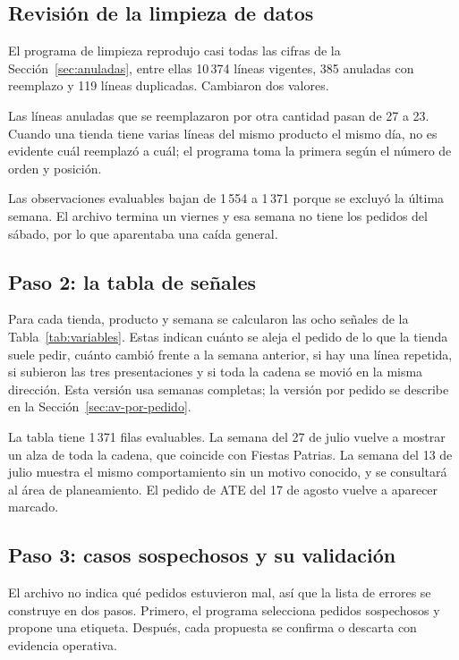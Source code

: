 \subsection{Revisión de la limpieza de datos}
\label{sec:av-limpieza}

El programa de limpieza reprodujo casi todas las cifras de la Sección~\ref{sec:anuladas}, entre ellas 10\,374 líneas vigentes, 385 anuladas con reemplazo y 119 líneas duplicadas. Cambiaron dos valores.

Las líneas anuladas que se reemplazaron por otra cantidad pasan de 27 a 23. Cuando una tienda tiene varias líneas del mismo producto el mismo día, no es evidente cuál reemplazó a cuál; el programa toma la primera según el número de orden y posición.

Las observaciones evaluables bajan de 1\,554 a 1\,371 porque se excluyó la última semana. El archivo termina un viernes y esa semana no tiene los pedidos del sábado, por lo que aparentaba una caída general.

\subsection{Paso 2: la tabla de señales}
\label{sec:av-senales}

Para cada tienda, producto y semana se calcularon las ocho señales de la Tabla~\ref{tab:variables}. Estas indican cuánto se aleja el pedido de lo que la tienda suele pedir, cuánto cambió frente a la semana anterior, si hay una línea repetida, si subieron las tres presentaciones y si toda la cadena se movió en la misma dirección. Esta versión usa semanas completas; la versión por pedido se describe en la Sección~\ref{sec:av-por-pedido}.

La tabla tiene 1\,371 filas evaluables. La semana del 27 de julio vuelve a mostrar un alza de toda la cadena, que coincide con Fiestas Patrias. La semana del 13 de julio muestra el mismo comportamiento sin un motivo conocido, y se consultará al área de planeamiento. El pedido de ATE del 17 de agosto vuelve a aparecer marcado.

\subsection{Paso 3: casos sospechosos y su validación}
\label{sec:av-marcado}

El archivo no indica qué pedidos estuvieron mal, así que la lista de errores se construye en dos pasos. Primero, el programa selecciona pedidos sospechosos y propone una etiqueta. Después, cada propuesta se confirma o descarta con evidencia operativa.

